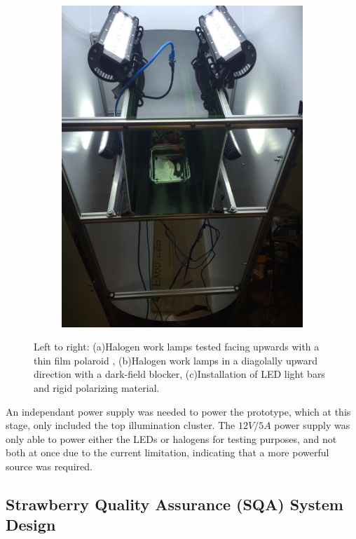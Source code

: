 \documentclass[fleqn,twoside]{article}
\begin{document}
\begin{figure}[h]
\begin{subfigure}{.32\textwidth}
		\includegraphics[width=\linewidth,angle=270,origin=c]{bench_led_rigid.jpg}
		\caption{}
		\label{fig:bench_led_rigid}
	\end{subfigure}%
	\caption{Left to right: (a)Halogen work lamps tested facing upwards with a thin film polaroid , (b)Halogen work lamps in a diagolally upward direction with a dark-field blocker, (c)Installation of LED light bars and rigid polarizing material.}
	\label{fig:test3}
\end{figure}


An independant power supply was needed to power the prototype, which at this stage, only included the top illumination cluster. The $12V/5A$ power supply was only able to power either the LEDs or halogens for testing purposes, and not both at once due to the current limitation, indicating that a more powerful source was required.   





\subsection{Strawberry Quality Assurance (SQA) System Design}
\end{document}

